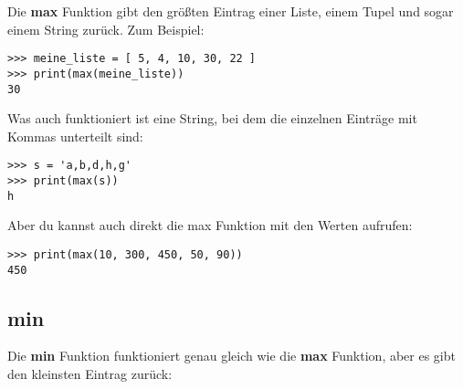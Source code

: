 Die \textbf{max} Funktion gibt den größten Eintrag einer Liste, einem Tupel und sogar einem String zurück. Zum Beispiel:

\begin{Verbatim}[frame=single]
>>> meine_liste = [ 5, 4, 10, 30, 22 ]
>>> print(max(meine_liste))
30
\end{Verbatim}

\noindent
Was auch funktioniert ist eine String, bei dem die einzelnen Einträge mit Kommas unterteilt sind:

\begin{Verbatim}[frame=single]
>>> s = 'a,b,d,h,g'
>>> print(max(s))
h
\end{Verbatim}

\noindent
Aber du kannst auch direkt die max Funktion mit den Werten aufrufen:

\begin{Verbatim}[frame=single]
>>> print(max(10, 300, 450, 50, 90))
450
\end{Verbatim}

\subsection*{min}

Die \textbf{min} Funktion funktioniert genau gleich wie die \textbf{max} Funktion, aber es gibt den kleinsten Eintrag zurück:

